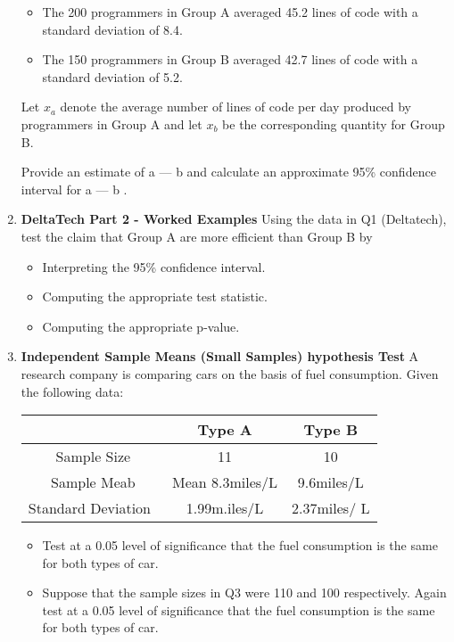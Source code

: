 \documentclass[]{report}
\begin{document}
\begin{enumerate}
	\begin{itemize}
		\item  The 200 programmers in Group A averaged 45.2 lines of code with a standard deviation of 8.4.
		
		\item The 150 programmers in Group B averaged 42.7 lines of code with a standard deviation of 5.2.
		
	\end{itemize}
	
	
	Let $x_a$ denote the average number of lines of code per day produced by programmers in Group A and
	let $x_b$ be the corresponding quantity for Group B.
	
	Provide an estimate of a — b and calculate an approximate 95\% confidence interval for a — b .
	
	\item \textbf{DeltaTech Part 2 - Worked Examples} 
	Using the data in Q1 (Deltatech), test the claim that Group A are more efficient than Group B by
	\begin{itemize}
		\item 	Interpreting the 95\% confidence interval.
		\item Computing the appropriate test statistic.
		\item Computing the appropriate p-value.
	\end{itemize}
	
	\item \textbf{Independent Sample Means (Small Samples) hypothesis Test }
	A research company is comparing cars on the basis of fuel consumption.
	Given the following data:
	\begin{center}
		\begin{tabular}{|c|c|c|} \hline
			&	Type A	&	Type B	\\	\hline
			Sample Size	&	11	&	10	\\	\hline
			Sample Meab	&	Mean 8.3miles/L	&	9.6miles/L	\\	\hline
			Standard Deviation 	&	1.99m.iles/L	&	2.37miles/ L	\\	\hline
		\end{tabular} 
		
	\end{center}
	
	\begin{itemize}
		\item Test at a 0.05 level of significance that the fuel consumption is the same for both types of car.
		
		\item Suppose that the sample sizes in Q3 were 110 and 100 respectively. Again test at a 0.05 level of significance that the fuel consumption is the same for both types of car.
	\end{itemize}
	
\end{enumerate}		
\end{document}
